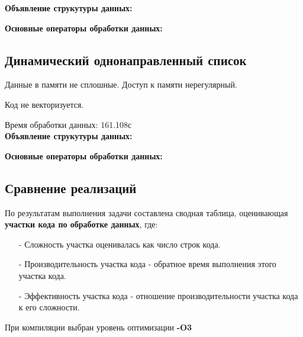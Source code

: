 \documentclass[a4paper, 12pt] {article}
\begin{document}
{\bfseries{\large Объявление струкутуры данных:}}


\newpage
{\bfseries{\large Основные операторы обработки данных:}}


\newpage
\subsection{Динамический однонаправленный список}

  Данные в памяти не сплошные. Доступ к памяти нерегулярный.

  Код не векторизуется.

  Время обработки данных: 161.108с\bigskip\\

{\bfseries{\large Объявление струкутуры данных:}}


\newpage
{\bfseries{\large Основные операторы обработки данных:}}


\newpage
\begin{center}
  \section{Сравнение реализаций}
\end{center}

  По результатам выполнения задачи составлена сводная таблица, оценивающая
\textbf{участки кода по обработке данных}, где:\smallskip

\begin{itemize}
  \item[-] Сложность участка оценивалась как число строк кода.
  \item[-] Производительность участка кода - обратное время выполнения этого
    участка кода.
  \item[-] Эффективность участка кода - отношение производительности участка
    кода к его сложности.
\end{itemize}

  При компиляции выбран уровень оптимизации \textbf{-O3}\medskip
\end{document}
